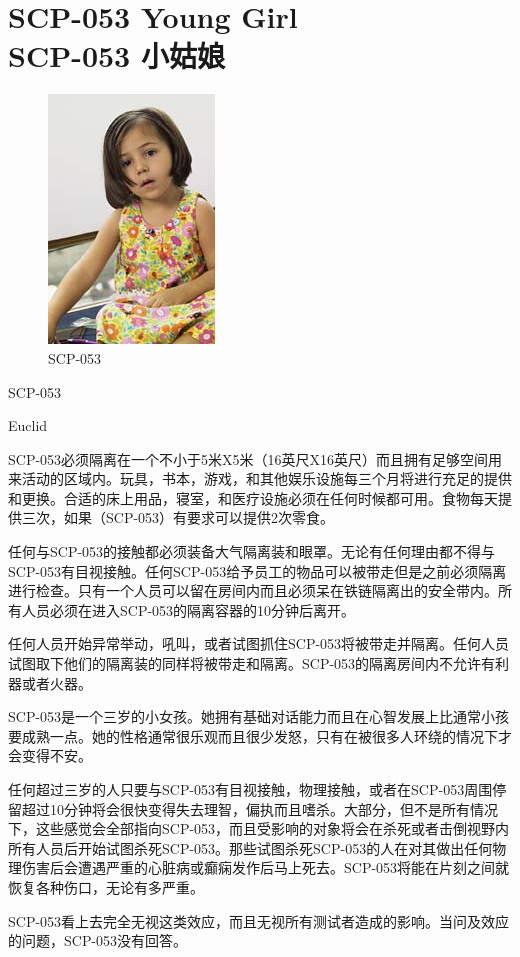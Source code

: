 \chapter[SCP-053 小姑娘]{
    SCP-053 Young Girl\\
    SCP-053 小姑娘
}

\label{chap:SCP-053}

\begin{figure}[H]
    \centering
    \includegraphics[width=0.3\linewidth]{images/SCP.053.jpg}
    \caption*{SCP-053}
\end{figure}

SCP-053

Euclid

SCP-053必须隔离在一个不小于5米X5米（16英尺X16英尺）而且拥有足够空间用来活动的区域内。玩具，书本，游戏，和其他娱乐设施每三个月将进行充足的提供和更换。合适的床上用品，寝室，和医疗设施必须在任何时候都可用。食物每天提供三次，如果（SCP-053）有要求可以提供2次零食。

任何与SCP-053的接触都必须装备大气隔离装和眼罩。无论有任何理由都不得与SCP-053有目视接触。任何SCP-053给予员工的物品可以被带走但是之前必须隔离进行检查。只有一个人员可以留在房间内而且必须呆在铁链隔离出的安全带内。所有人员必须在进入SCP-053的隔离容器的10分钟后离开。

任何人员开始异常举动，吼叫，或者试图抓住SCP-053将被带走并隔离。任何人员试图取下他们的隔离装的同样将被带走和隔离。SCP-053的隔离房间内不允许有利器或者火器。

SCP-053是一个三岁的小女孩。她拥有基础对话能力而且在心智发展上比通常小孩要成熟一点。她的性格通常很乐观而且很少发怒，只有在被很多人环绕的情况下才会变得不安。

任何超过三岁的人只要与SCP-053有目视接触，物理接触，或者在SCP-053周围停留超过10分钟将会很快变得失去理智，偏执而且嗜杀。大部分，但不是所有情况下，这些感觉会全部指向SCP-053，而且受影响的对象将会在杀死或者击倒视野内所有人员后开始试图杀死SCP-053。那些试图杀死SCP-053的人在对其做出任何物理伤害后会遭遇严重的心脏病或癫痫发作后马上死去。SCP-053将能在片刻之间就恢复各种伤口，无论有多严重。

SCP-053看上去完全无视这类效应，而且无视所有测试者造成的影响。当问及效应的问题，SCP-053没有回答。
